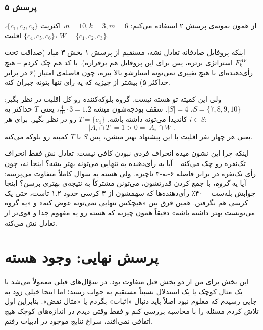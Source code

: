 \documentclass[12pt, a4paper]{article}
\begin{document}
\subsubsection*{پرسش ۵}

از همون نمونه‌ی پرسش ۲ استفاده می‌کنم: $n=10,k=3,m=6$، اکثریت $\{c_1,c_2,c_3\}$، اقلیت $\{c_4,c_5,c_6\}$، $W=\{c_1,c_2,c_3\}$.

اینکه پروفایل صادقانه تعادل نشه، مستقیم از پرسش ۱ بخش ۳ میاد (صداقت تحت $F_k^{AV}$ استراتژی برتره، پس برای این پروفایل هم برقراره). با کد هم چک کردم -- هیچ رأی‌دهنده‌ای با هیچ تغییری نمی‌تونه امتیازشو بالا ببره، چون فاصله‌ی امتیاز (۶ در برابر حداکثر ۵) بیشتر از چیزیه که یه رأی تنها بتونه جبران کنه.

ولی این کمیته تو هسته نیست. گروه بلوکه‌کننده رو کل اقلیت در نظر بگیر: $S=\{7,8,9,10\}$، $|S|=4$. سقف بودجه‌شون میشه $\frac{4}{10}\cdot3=1.2$، یعنی $T$ حداکثر یه کاندیدا می‌تونه داشته باشه. $T=\{c_4\}$ رو در نظر بگیر. برای هر $i\in S$:
\[
|A_i\cap T|=1 > 0=|A_i\cap W|.
\]
یعنی هر چهار نفر اقلیت با این پیشنهاد بهتر میشن، پس $S$ با $T$ کمیته رو بلوکه می‌کنه.

اینکه چرا این نشون میده انحراف فردی نبودن کافی نیست: تعادل نش فقط انحراف تک‌نفره رو چک می‌کنه -- آیا \emph{یه} رأی‌دهنده به تنهایی می‌تونه بهتر بشه؟ اینجا نه، چون رأی تک‌نفره در برابر فاصله ۶-به-۴ ناچیزه. ولی هسته یه سوال کاملاً متفاوت می‌پرسه: آیا یه \emph{گروه}، با جمع کردن قدرتشون، می‌تونن مشترکاً به نتیجه‌ی بهتری برسن؟ اینجا جوابش بله‌ست -- ۴۰٪ رأی‌دهنده‌ها که سهمشون از ۳ کرسی حدود ۱.۲ تاست، حتی یک کرسی هم نگرفتن. همین فرق بین «هیچکس تنهایی نمی‌تونه عوض کنه» و «یه گروه می‌تونست بهتر داشته باشه» دقیقاً همون چیزیه که هسته رو یه مفهوم جدا و قوی‌تر از تعادل نش می‌کنه.











\section{پرسش نهایی: وجود هسته}

این بخش برای من از دو بخش قبل متفاوت بود. در سؤال‌های قبلی معمولاً می‌شد با یک مثال کوچک یا یک استدلال نسبتاً مستقیم به جواب رسید؛ اما اینجا خیلی زود به جایی رسیدم که معلوم نبود اصلاً باید دنبال «اثبات» بگردم یا «مثال نقض». بنابراین اول تلاش کردم مسئله را با محاسبه بررسی کنم و فقط وقتی دیدم در اندازه‌های کوچک هیچ اتفاقی نمی‌افتد، سراغ نتایج موجود در ادبیات رفتم.
\end{document}
